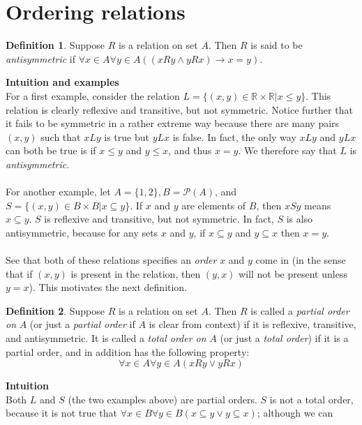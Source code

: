 \documentclass{report}
\theoremstyle{definition}
\newtheorem*{definition}{Definition}
\begin{document}
\section{Ordering relations}
\begin{definition}
Suppose $R$ is a relation on set $A$. Then $R$ is said to be \textit{antisymmetric} if $\forall x\in A\forall y\in A((xRy\land yRx)\to x=y)$.
\end{definition}
\noindent\textbf{Intuition and examples}\\
For a first example, consider the relation $L=\{(x,y)\in\mathbb R\times\mathbb R|x\leq y\}$. This relation is clearly reflexive and transitive, but not symmetric. Notice further that it fails
to be symmetric in a rather extreme way because there are many pairs $(x,y)$ such that $xLy$ is true but $yLx$ is false. In fact, the only way $xLy$ and $yLx$ can both be true is if
$x\leq y$ and $y\leq x$, and thus $x=y$. We therefore say that $L$ is \textit{antisymmetric}.\\
\vspace{1mm}\\
For another example, let $A=\{1,2\},B=\mathscr P(A)$, and $S=\{(x,y)\in B\times B|x\subseteq y\}$.
If $x$ and $y$ are elements of $B$, then $xSy$ means $x\subseteq y$. $S$ is reflexive and transitive, but not symmetric. In fact, $S$ is also antisymmetric, because for any sets
$x$ and $y$, if $x\subseteq y$ and $y\subseteq x$ then $x=y$.\\
\vspace{1mm}\\
See that both of these relations specifies an \textit{order} $x$ and $y$ come in (in the sense that if $(x,y)$ is present in the relation, then $(y,x)$ will not be present unless $y=x$). This
motivates the next definition.
\begin{definition}
Suppose $R$ is a relation on set $A$. Then $R$ is called a \textit{partial order on} $A$ (or just a \textit{partial order} if $A$ is clear from context) if it is reflexive, transitive, 
and antisymmetric. It is called a \textit{total order on} $A$ (or just a \textit{total order}) if it is a partial order, and in addition has the following property:
\begin{equation*}
\forall x\in A\forall y\in A(xRy\lor yRx)
\end{equation*}
\end{definition}
\noindent\textbf{Intuition}\\
Both $L$ and $S$ (the two examples above) are partial orders. $S$ is not a total order, because it is not true that $\forall x\in B\forall y\in B(x\subseteq y\lor y\subseteq x)$; although we can
\end{document}
